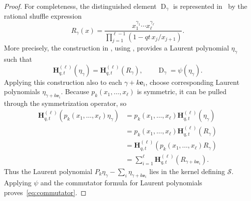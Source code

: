 \documentclass[reqno]{amsart}
\theoremstyle{plain}
\theoremstyle{definition}
\theoremstyle{remark}
\DeclareMathOperator{\D}{D}
\newcommand{\<}{\langle}
\renewcommand{\>}{\rangle}
\begin{document}
\begin{proof}
    For completeness, the distinguished element $\D_{\gamma}$ is represented
    in~\cite[(51)--(52)]{BHMPS2023ShuffleAnyLine} by the rational shuffle expression
    \[ R_{\gamma}(x)
        = \frac{x_1^{\gamma_1}\cdots x_\ell^{\gamma_\ell}} {\prod_{j=1}^{\ell-1}(1-qt\,x_j/x_{j+1})}.
    \]
    More precisely, the construction in \cite[Section~3.6]{BHMPS2023ShuffleAnyLine}, using \cite[Proposition~6.1]{Negut2014ShuffleAlgebra}, provides a Laurent polynomial $\eta_{\gamma}$ such that
    \[
        \mathbf{H}_{q,t}^{(\ell)}(\eta_{\gamma}) =\mathbf{H}_{q,t}^{(\ell)}(R_{\gamma}),
        \qquad \D_{\gamma}=\psi(\eta_{\gamma}).
    \]
    Applying this construction also to each $\gamma+k\mathbf e_i$, choose corresponding Laurent polynomials $\eta_{\gamma+k\mathbf e_i}$. Because $p_k(x_1,\dots,x_\ell)$ is symmetric, it can be pulled through the symmetrization operator, so
    \begin{align*}
        \mathbf{H}_{q,t}^{(\ell)}(p_k(x_1,\dots,x_\ell) \eta_{\gamma})
        & = p_k(x_1,\dots,x_\ell) \mathbf{H}_{q,t}^{(\ell)}(\eta_{\gamma})\\
        & = p_k(x_1,\dots,x_\ell) \mathbf{H}_{q,t}^{(\ell)}(R_{\gamma})\\
        & = \mathbf{H}_{q,t}^{(\ell)}(p_k(x_1,\dots,x_\ell) R_{\gamma})\\
        & = \sum_{i=1}^{\ell} \mathbf{H}_{q,t}^{(\ell)}(R_{\gamma + k\mathbf{e}_i}).
    \end{align*}
    Thus the Laurent polynomial $P_k\eta_\gamma-\sum_i\eta_{\gamma+k\mathbf e_i}$ lies in the kernel defining $\mathcal S$. Applying $\psi$ and the commutator formula for Laurent polynomials proves~\eqref{eq:commutator}.
\end{proof}
\end{document}
